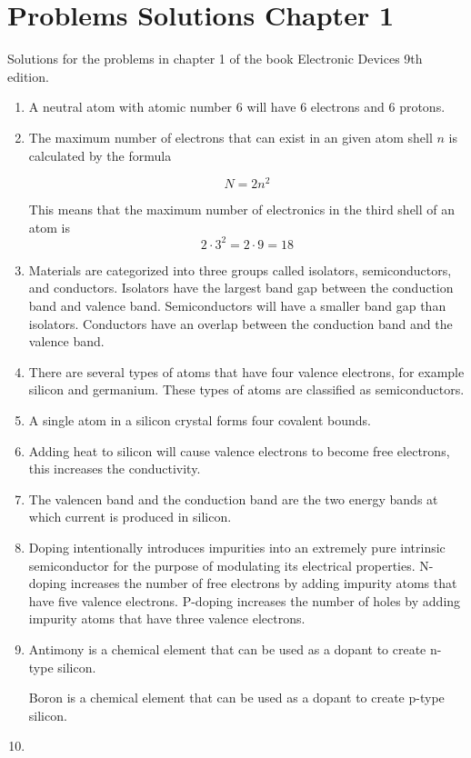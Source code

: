 \documentclass[fleqn]{article}
\begin{document}
\section*{Problems Solutions Chapter 1}
Solutions for the problems in chapter 1 of the book Electronic Devices 9th edition.

\begin{enumerate}[label=\textbf{\arabic*.}]

\item A neutral atom with atomic number 6 will have 6 electrons and 6 protons. 
  
\item The maximum number of electrons that can exist in an given atom shell $ n $ is calculated by the formula

\[
  N = 2n^2
\]

This means that the maximum number of electronics in the third shell of an atom is
\[ 
  2 \cdot 3^2 = 2 \cdot 9 = 18
\]

\item
Materials are categorized into three groups called isolators, semiconductors, and conductors. Isolators have the largest band gap between the conduction band and valence band. Semiconductors will have a smaller band gap than isolators. Conductors have an overlap between the conduction band and the valence band.

\item
There are several types of atoms that have four valence electrons, for example silicon and germanium. These types of atoms are classified as semiconductors.

\item
A single atom in a silicon crystal forms four covalent bounds.

\item
Adding heat to silicon will cause valence electrons to become free electrons, this increases the conductivity.

\item
The valencen band and the conduction band are the two energy bands at which current is produced in silicon.

\item
Doping intentionally introduces impurities into an extremely pure intrinsic semiconductor for the purpose of modulating its electrical properties. N-doping increases the number of free electrons by adding impurity atoms that have five valence electrons. P-doping increases the number of holes by adding impurity atoms that have three valence electrons.

\item
Antimony is a chemical element that can be used as a dopant to create n-type silicon.

Boron is a chemical element that can be used as a dopant to create p-type silicon.

\item



\end{enumerate}
\end{document}
